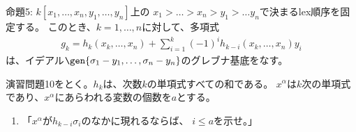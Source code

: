 \begin{framed}
  命題5: $k[x_1,\dots,x_n,y_1,\dots,y_n]$上の
  $x_1>\dots>x_n>y_1>\dots y_n$で決まるlex順序を固定する。
  このとき、$k=1,\dots,n$に対して、多項式
  \begin{align}
    g_k = h_k(x_k,\dots,x_n) + \sum_{i=1}^k (-1)^i h_{k-i}(x_k,\dots,x_n)y_i
  \end{align}
  は、イデアル$\gen{\sigma_1-y_1,\dots,\sigma_n-y_n}$のグレブナ基底をなす。
\end{framed}
\begin{myproof}
  演習問題10をとく。$h_k$は、次数$k$の単項式すべての和である。
  $x^\alpha$は$k$次の単項式であり、$x^\alpha$にあらわれる変数の個数を$a$とする。
  \begin{enumerate}[label=(\alph*)]
    \item

      「$x^\alpha$が$h_{k-i}\sigma_i$のなかに現れるならば、
      $i\le a$を示せ。」



\end{enumerate}
\end{myproof}
